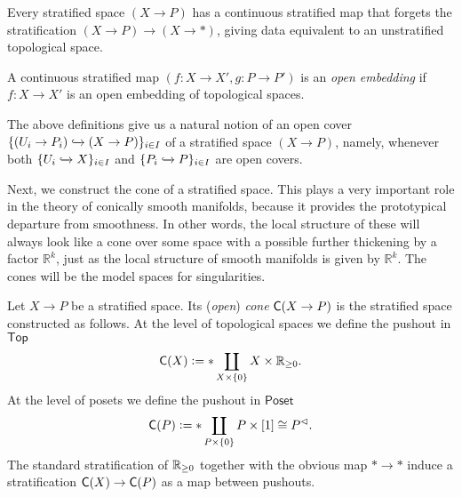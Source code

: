 \documentclass[../text]{subfiles}
\begin{document}
\begin{example}\label{ex:forget_strat}
    Every stratified space $(X \rightarrow P)$ has a continuous stratified map that forgets the stratification $(X \rightarrow P) \rightarrow (X \rightarrow *)$, giving data equivalent to an unstratified topological space. 
\end{example}

\begin{definition}
    A continuous stratified map $(f: X \rightarrow X', g: P \rightarrow P')$ is an \emph{open embedding} if $f: X \rightarrow X'$ is an open embedding of topological spaces.
\end{definition}

\begin{remark}
    The above definitions give us a natural notion of an open cover $\{ (U_i \rightarrow P_i) \xhookrightarrow{} (X \rightarrow P)\}_{i \in I}$ of a stratified space $(X \rightarrow P)$, namely, whenever both $\{ U_i \xhookrightarrow{} X\}_{i \in I}$ and $\{ P_i \xhookrightarrow{} P \}_{i \in I}$ are open covers.
\end{remark}

Next, we construct the cone of a stratified space. This plays a very important role in the theory of conically smooth manifolds, because it provides the prototypical departure from smoothness. In other words, the local structure of these will always look like a cone over some space with a possible further thickening by a factor $\mathbb{R}^k$, just as the local structure of smooth manifolds is given by $\mathbb{R}^k$. The cones will be the model spaces for singularities.

\begin{definition}
    Let $X \rightarrow P$ be a stratified space. Its (\emph{open}) \emph{cone} $\cone(X \rightarrow P)$ is the stratified space constructed as follows. At the level of topological spaces we define the pushout in $\mathsf{Top}$
    \begin{equation}
        \cone(X) := * \coprod_{X \times \{0\}} X \times \hoint.
    \end{equation}
    At the level of posets we define the pushout in $\mathsf{Poset}$
    \begin{equation}
        \cone(P) := * \coprod_{P \times \{ 0\}} P \times [1] \cong P^{\vartriangleleft}.
    \end{equation}
    The standard stratification of $\mathbb{R}_{\geq 0}$ together with the obvious map $* \rightarrow *$ induce a stratification $\cone(X) \rightarrow \cone(P)$ as a map between pushouts. 
\end{definition}
\end{document}
